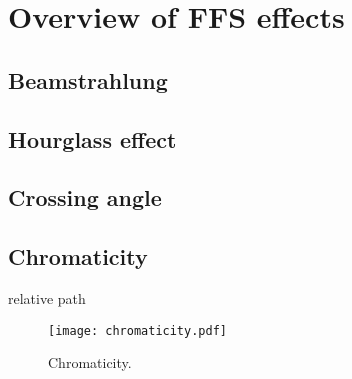 \chapter{Overview of FFS effects}
\section{Beamstrahlung}
\section{Hourglass effect}
\section{Crossing angle}
\section{Chromaticity}
relative path 
\begin{figure}[!hbt]
\texttt{[image: chromaticity.pdf]}
\centering
\caption{Chromaticity.}\label{f:chrom}
\end{figure}